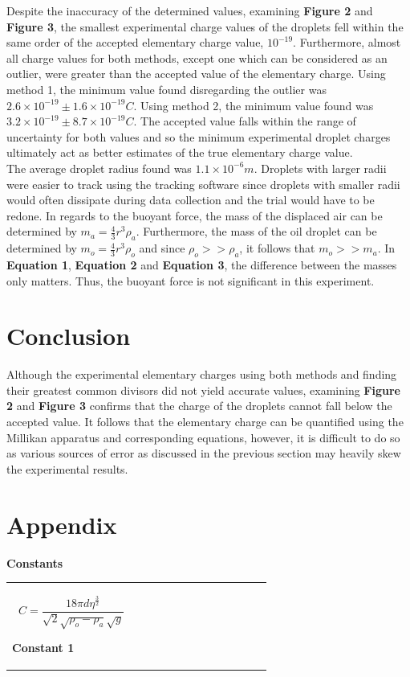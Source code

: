 \documentclass[
	letterpaper, %
	10pt, %
]{CSUniSchoolLabReport}
\begin{document}
Despite the inaccuracy of the determined values, examining \textbf{Figure 2} and \textbf{Figure 3}, the smallest experimental
charge values of the droplets fell within the same order of the accepted elementary charge value, $10^{-19}$. Furthermore, almost
all charge values for both methods, except one which can be considered as an outlier, were greater than the accepted value of
the elementary charge. Using method 1, the minimum value found disregarding the outlier was $2.6\times10^{-19}\pm 1.6\times10^{-19}C$.
Using method 2, the minimum value found was $3.2\times10^{-19}\pm8.7\times10^{-19}C$. The accepted value falls within the range
of uncertainty for both values and so the minimum experimental droplet charges ultimately act as better estimates of the true
elementary charge value.\\

The average droplet radius found was $1.1\times 10^{-6}m$. Droplets with larger radii were easier to track using the
tracking software since droplets with smaller radii would often dissipate during data collection and the trial would have to
be redone. In regards to the buoyant force, the mass of the displaced air can be determined by $m_a=\frac 43r^3\rho_a$.
Furthermore, the mass of the oil droplet can be determined by $m_o=\frac 43r^3\rho_o$ and since $\rho_o >> \rho_a$, it follows that
$m_o>>m_a$. In \textbf{Equation 1}, \textbf{Equation 2} and \textbf{Equation 3}, the difference between the masses only matters.
Thus, the buoyant force is not significant in this experiment.
\section{Conclusion}
Although the experimental elementary charges using both methods and finding their greatest common divisors did not yield accurate
values, examining \textbf{Figure 2} and \textbf{Figure 3} confirms that the charge of the droplets cannot fall below the accepted value. It
follows that the elementary charge can be quantified using the Millikan apparatus and corresponding equations, however,
it is difficult to do so as various sources of error as discussed in the previous section may heavily skew the experimental
results.

\newpage
\section{Appendix}
{\Large\textbf{Constants}}\\
\begin{tabular}{p{0.45\linewidth} p{0.45\linewidth}}
    $$C = \frac{18\pi d \eta^\frac{3}{2}}{\sqrt2 \sqrt{\rho_o-\rho_a}\sqrt g}$$
    \begin{center}
        \textbf{Constant 1}
    \end{center}
\end{tabular}\\
\end{document}
